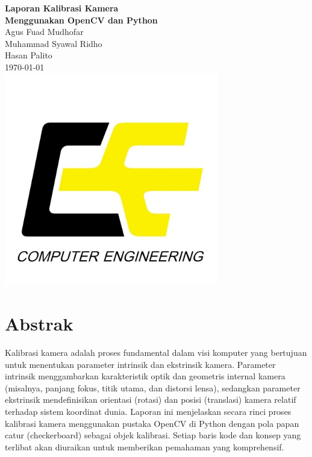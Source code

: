 \documentclass[12pt,a4paper]{article}
\begin{document}

\begin{titlepage}
    \begin{center}
        \vspace*{1cm}
        {\LARGE \textbf{Laporan Kalibrasi Kamera\\Menggunakan OpenCV dan Python}}\\[1.5cm]
        {\large Agus Fuad Mudhofar}\\[0.3cm]
        {\large Muhammad Syawal Ridho}\\[0.3cm]
        {\large Hasan Palito }\\[0.5cm]
        {\large \today}\\
        \includegraphics[width=0.7\textwidth]{Computer-Engineering-1.jpg}\\[1cm]
    \end{center}
\end{titlepage}
\thispagestyle{empty}
\newpage

\tableofcontents
\newpage

\section{Abstrak}
Kalibrasi kamera adalah proses fundamental dalam visi komputer yang bertujuan
untuk menentukan parameter intrinsik dan ekstrinsik kamera. Parameter intrinsik
menggambarkan karakteristik optik dan geometris internal kamera (misalnya,
panjang fokus, titik utama, dan distorsi lensa), sedangkan parameter ekstrinsik
mendefinisikan orientasi (rotasi) dan posisi (translasi) kamera relatif
terhadap sistem koordinat dunia. Laporan ini menjelaskan secara rinci proses
kalibrasi kamera menggunakan pustaka OpenCV di Python dengan pola papan catur
(checkerboard) sebagai objek kalibrasi. Setiap baris kode dan konsep yang
terlibat akan diuraikan untuk memberikan pemahaman yang komprehensif.
\end{document}
